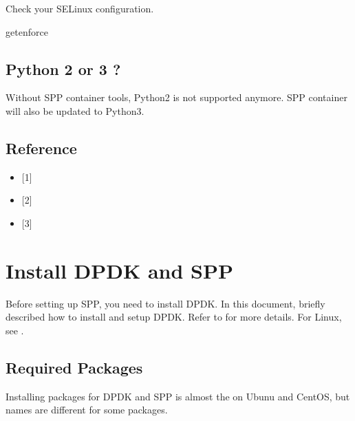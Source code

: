 \documentclass[a4paper,11pt,openany,oneside,english]{sphinxmanual}
\begin{document}
Check your SELinux configuration.

\begin{sphinxVerbatim}[commandchars=\\\{\},formatcom=\footnotesize]
 getenforce
\end{sphinxVerbatim}


\subsection{Python 2 or 3 ?}
\label{\detokenize{gsg/setup:python-2-or-3}}
Without SPP container tools, Python2 is not supported anymore.
SPP container will also be updated to Python3.


\subsection{Reference}
\label{\detokenize{gsg/setup:reference}}\begin{itemize}
\item {} 
{[}1{]} 

\item {} 
{[}2{]} 

\item {} 
{[}3{]} 

\end{itemize}


\section{Install DPDK and SPP}
\label{\detokenize{gsg/install:install-dpdk-and-spp}}\label{\detokenize{gsg/install:setup-install-dpdk-spp}}\label{\detokenize{gsg/install::doc}}
Before setting up SPP, you need to install DPDK.
In this document, briefly described how to install and setup DPDK.
Refer to  for more details.
For Linux, see  .


\subsection{Required Packages}
\label{\detokenize{gsg/install:required-packages}}\label{\detokenize{gsg/install:setup-install-packages}}
Installing packages for DPDK and SPP is almost the on Ubunu and CentOS,
but names are different for some packages.
\end{document}
